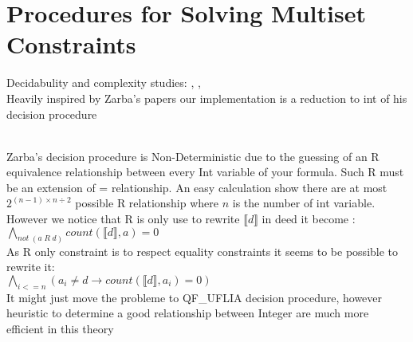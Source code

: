
\section{Procedures for Solving Multiset Constraints}
\label{sec:rworks}

Decidabulity and complexity studies:
\cite{DBLP:conf/csl/AikenKVW93},
\cite{DBLP:journals/scp/OliveiraDF12},
\\Heavily inspired by Zarba's papers our implementation is a reduction to int
of his decision procedure

\\Zarba's decision procedure is Non-Deterministic due to the guessing of an R equivalence relationship
between every Int variable of your formula. Such R must be an extension of = relationship.
An easy calculation show there are at most $2^{(n-1) \times n \div 2}$ possible R relationship where $n$ is the
number of int variable.
\\However we notice that R is only use to rewrite $\llbracket d \rrbracket$ in deed it become :
\\ $ \underset{not\;(a\; R\; d)}{\bigwedge} count(\llbracket d \rrbracket,a) = 0$
\\As R only constraint is to respect equality constraints it seems to be possible to rewrite it:
\\ $ \underset{i<=n}{\bigwedge} (a_{i} \neq d \rightarrow count(\llbracket d \rrbracket,a_{i}) = 0)$
\\It might just move the probleme to QF\_UFLIA decision procedure, however heuristic to determine a good
relationship between Integer are much more efficient in this theory

